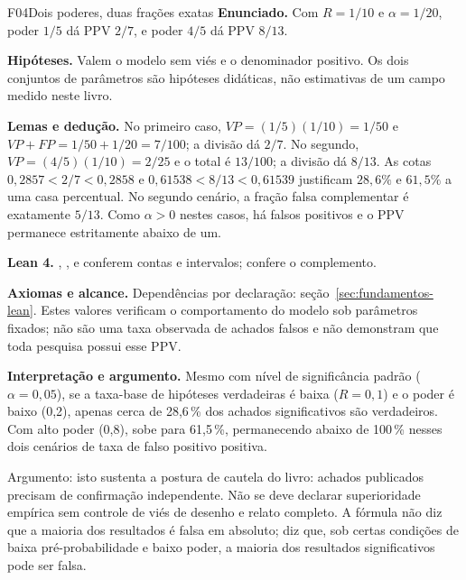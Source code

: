 \begin{formalizacao}{F04}{Dois poderes, duas frações exatas}
\textbf{Enunciado.} Com $R=1/10$ e $\alpha=1/20$, poder $1/5$ dá PPV $2/7$, e poder $4/5$ dá PPV $8/13$.

\textbf{Hipóteses.} Valem o modelo sem viés e o denominador positivo. Os dois conjuntos de parâmetros são hipóteses didáticas, não estimativas de um campo medido neste livro.

\textbf{Lemas e dedução.} No primeiro caso, $VP=(1/5)(1/10)=1/50$ e $VP+FP=1/50+1/20=7/100$; a divisão dá $2/7$. No segundo, $VP=(4/5)(1/10)=2/25$ e o total é $13/100$; a divisão dá $8/13$. As cotas $0{,}2857<2/7<0{,}2858$ e $0{,}61538<8/13<0{,}61539$ justificam $28{,}6\%$ e $61{,}5\%$ a uma casa percentual. No segundo cenário, a fração falsa complementar é exatamente $5/13$. Como $\alpha>0$ nestes casos, há falsos positivos e o PPV permanece estritamente abaixo de um.

\textbf{Lean 4.} , ,  e  conferem contas e intervalos;  confere o complemento.

\textbf{Axiomas e alcance.} Dependências por declaração: seção~\ref{sec:fundamentos-lean}. Estes valores verificam o comportamento do modelo sob parâmetros fixados; não são uma taxa observada de achados falsos e não demonstram que toda pesquisa possui esse PPV.
\end{formalizacao}

\begin{descricao}
\textbf{Interpretação e argumento.} Mesmo com nível de significância padrão ($\alpha = 0{,}05$), se a taxa-base de hipóteses verdadeiras é baixa ($R = 0{,}1$) e o poder é baixo (0,2), apenas cerca de 28,6\,\% dos achados significativos são verdadeiros. Com alto poder (0,8), sobe para 61,5\,\%, permanecendo abaixo de 100\,\% nesses dois cenários de taxa de falso positivo positiva.

Argumento: isto sustenta a postura de cautela do livro: achados publicados precisam de confirmação independente. Não se deve declarar superioridade empírica sem controle de viés de desenho e relato completo. A fórmula não diz que a maioria dos resultados é falsa em absoluto; diz que, sob certas condições de baixa pré-probabilidade e baixo poder, a maioria dos resultados significativos pode ser falsa.
\end{descricao}

